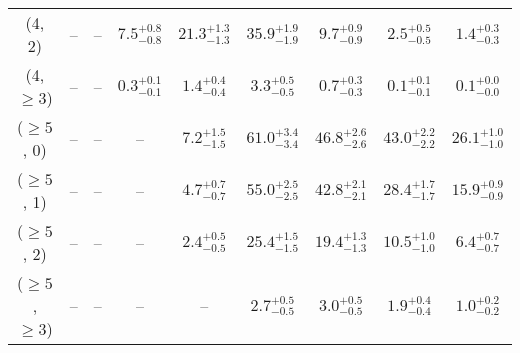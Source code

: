\begin{table}[h!]
{\begin{tabular}{ccccccccc}
	(4, 2) & -- & -- & $7.5^{+ 0.8 }_{- 0.8 }$ & $21.3^{+ 1.3 }_{- 1.3 }$ & $35.9^{+ 1.9 }_{- 1.9 }$ & $9.7^{+ 0.9 }_{- 0.9 }$ & $2.5^{+ 0.5 }_{- 0.5 }$ & $1.4^{+ 0.3 }_{- 0.3 }$ \\[0.5ex] 
	(4, $\ge3$) & -- & -- & $0.3^{+ 0.1 }_{- 0.1 }$ & $1.4^{+ 0.4 }_{- 0.4 }$ & $3.3^{+ 0.5 }_{- 0.5 }$ & $0.7^{+ 0.3 }_{- 0.3 }$ & $0.1^{+ 0.1 }_{- 0.1 }$ & $0.1^{+ 0.0 }_{- 0.0 }$ \\[0.5ex] 
	($\ge5$, 0) & -- & -- & -- & $7.2^{+ 1.5 }_{- 1.5 }$ & $61.0^{+ 3.4 }_{- 3.4 }$ & $46.8^{+ 2.6 }_{- 2.6 }$ & $43.0^{+ 2.2 }_{- 2.2 }$ & $26.1^{+ 1.0 }_{- 1.0 }$ \\[0.5ex] 
	($\ge5$, 1) & -- & -- & -- & $4.7^{+ 0.7 }_{- 0.7 }$ & $55.0^{+ 2.5 }_{- 2.5 }$ & $42.8^{+ 2.1 }_{- 2.1 }$ & $28.4^{+ 1.7 }_{- 1.7 }$ & $15.9^{+ 0.9 }_{- 0.9 }$ \\[0.5ex] 
	($\ge5$, 2) & -- & -- & -- & $2.4^{+ 0.5 }_{- 0.5 }$ & $25.4^{+ 1.5 }_{- 1.5 }$ & $19.4^{+ 1.3 }_{- 1.3 }$ & $10.5^{+ 1.0 }_{- 1.0 }$ & $6.4^{+ 0.7 }_{- 0.7 }$ \\[0.5ex] 
	($\ge5$, $\ge3$) & -- & -- & -- & -- & $2.7^{+ 0.5 }_{- 0.5 }$ & $3.0^{+ 0.5 }_{- 0.5 }$ & $1.9^{+ 0.4 }_{- 0.4 }$ & $1.0^{+ 0.2 }_{- 0.2 }$ \\[0.5ex] 
	\hline
	\hline
\end{tabular}}
\end{table}
